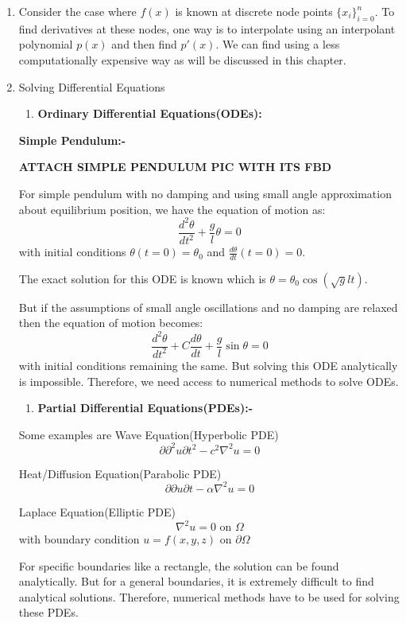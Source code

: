\documentclass[
]{book}
\providecommand{\tightlist}{%
  \setlength{\itemsep}{0pt}\setlength{\parskip}{0pt}}
\begin{document}
\begin{enumerate}
\def\labelenumi{\arabic{enumi}.}
\item
  Consider the case where \(f(x)\) is known at discrete node points \(\{x_i\}_{i=0}^n\). To find derivatives at these nodes, one way is to interpolate using an interpolant polynomial \(p(x)\) and then find \(p'(x)\). We can find using a less computationally expensive way as will be discussed in this chapter.
\item
  Solving Differential Equations

  \begin{enumerate}
  \def\labelenumii{\alph{enumii}.}
  \tightlist
  \item
    \textbf{Ordinary Differential Equations(ODEs):}
  \end{enumerate}

  \textbf{Simple Pendulum:-}

  \textbf{ATTACH SIMPLE PENDULUM PIC WITH ITS FBD}

  For simple pendulum with no damping and using small angle approximation about equilibrium position, we have the equation of motion as:
  \begin{equation}
   \frac{d^2\theta}{dt^2}+\frac{g}{l}\theta = 0
   \end{equation}
  with initial conditions \(\theta(t=0)= \theta_0\) and \(\frac{d\theta}{dt}(t=0) = 0\).

  The exact solution for this ODE is known which is \(\theta = \theta_0 \cos\left( \sqrt{g}{l} t \right)\).

  But if the assumptions of small angle oscillations and no damping are relaxed then the equation of motion becomes:
  \begin{equation}
   \frac{d^2\theta}{dt^2}+C\frac{d\theta}{dt}+\frac{g}{l}\sin \theta = 0
   \end{equation}
  with initial conditions remaining the same. But solving this ODE analytically is impossible. Therefore, we need access to numerical methods to solve ODEs.

  \begin{enumerate}
  \def\labelenumii{\alph{enumii}.}
  \setcounter{enumii}{1}
  \tightlist
  \item
    \textbf{Partial Differential Equations(PDEs):-}
  \end{enumerate}

  Some examples are Wave Equation(Hyperbolic PDE)
  \[\partial{\partial^2 u}{\partial t^2}-c^2 \nabla^2 u= 0\]

  Heat/Diffusion Equation(Parabolic PDE)
  \[\partial{\partial u}{\partial t}-\alpha \nabla^2 u= 0\]

  Laplace Equation(Elliptic PDE)
  \[\nabla^2 u = 0 \text{ on } \Omega\]
  with boundary condition \(u = f(x,y,z)\) on \(\partial \Omega\)

  For specific boundaries like a rectangle, the solution can be found analytically. But for a general boundaries, it is extremely difficult to find analytical solutions. Therefore, numerical methods have to be used for solving these PDEs.
\end{enumerate}
\end{document}
